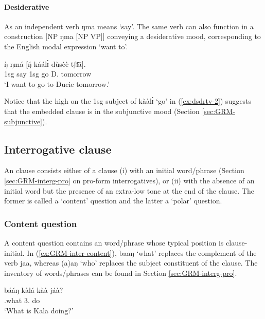 \paragraph{Desiderative}
\label{sec:GRM-desiderative-mood}


As an independent verb {\sls ŋma} means `say'. The same verb can also function in a construction [NP {\sls ŋma} [NP VP]]  conveying a desiderative mood,  corresponding to the English modal expression `want to'.

\ea\label{ex:dsdrtv-2}
\gll ŋ̀ ŋmá [ŋ́ káálɪ̀ dùsèè tʃɪ̄ā].\\
  {\sc 1sg} say  {\sc 1sg} go D. tomorrow\\
\glt  `I want to go to Ducie tomorrow.'
\z 

 Notice that the high  on the  {\sc 1sg}  subject of {\sls kààlɪ̀} `go'  in (\ref{ex:dsdrtv-2})  suggests that the embedded clause is in the subjunctive mood (Section \ref{sec:GRM-subjunctive}).

 
 \subsection{Interrogative clause}
\label{sec:GRM-interr-clause}

An  clause consists either of a clause (i) with an initial
 word/phrase (Section \ref{sec:GRM-interg-pro} on pro-form 
interrogatives), or (ii) with the absence of an initial 
word but the presence of an extra-low tone at the end of the clause. The former
is called a `content' question and the latter a `polar' question. 

\subsubsection{Content question}
\label{sec:GRM-interr-content}

A content question contains an  word/phrase whose typical position is clause-initial. In (\ref{ex:GRM-inter-content}), {\sls baaŋ} `what' replaces the complement of the verb {\sls jaa}, whereas {\sls (a)aŋ} `who'  replaces the subject constituent of the clause. The inventory of  words/phrases can be found in Section \ref{sec:GRM-interg-pro}.

\ea\label{ex:GRM-inter-content}
\ea\label{ex:GRM-inter-content-what}
\gll bááŋ kàlá kàà jáà?\\
{\q}.what {3.\sg} {\ipfv} do\\
 \glt  `What is Kala doing?' 

